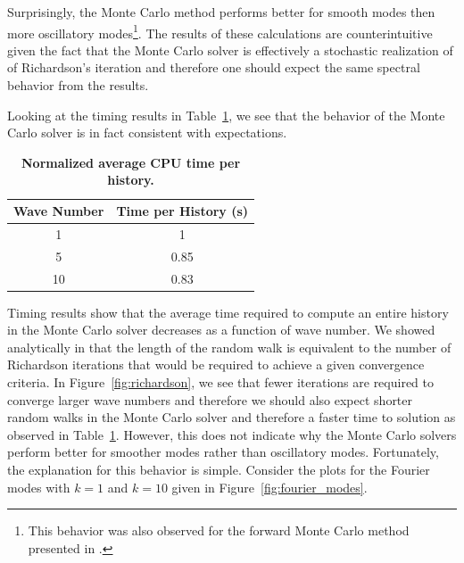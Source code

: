 \documentclass[note]{TechNote}
\begin{document}
Surprisingly, the Monte Carlo method performs better for smooth modes
then more oscillatory modes\footnote{This behavior was also observed
  for the forward Monte Carlo method presented in
  \cite{evans_monte_2012}.}. The results of these calculations are
counterintuitive given the fact that the Monte Carlo solver is
effectively a stochastic realization of of Richardson's iteration and
therefore one should expect the same spectral behavior from the
results.

Looking at the timing results in Table~\ref{tab:mc_timing}, we see
that the behavior of the Monte Carlo solver is in fact consistent with
expectations.
\begin{table}[h!]
  \begin{center}
    \begin{tabular}{cc}\hline\hline
      \multicolumn{1}{c}{\textbf{Wave Number}} & 
      \multicolumn{1}{c}{\textbf{Time per History (s)}} \\
      \hline
      1 & 1 \\
      5 & 0.85 \\
      10 & 0.83 \\
      \hline\hline
    \end{tabular}
  \end{center}
  \caption{\textbf{Normalized average CPU time per history.}}
  \label{tab:mc_timing}
\end{table}
Timing results show that the average time required to compute an
entire history in the Monte Carlo solver decreases as a function of
wave number. We showed analytically in \cite{slattery_2013} that the
length of the random walk is equivalent to the number of Richardson
iterations that would be required to achieve a given convergence
criteria. In Figure~\ref{fig:richardson}, we see that fewer iterations
are required to converge larger wave numbers and therefore we should
also expect shorter random walks in the Monte Carlo solver and
therefore a faster time to solution as observed in
Table~\ref{tab:mc_timing}. However, this does not indicate why the
Monte Carlo solvers perform better for smoother modes rather than
oscillatory modes. Fortunately, the explanation for this behavior is
simple. Consider the plots for the Fourier modes with $k = 1$ and $k =
10$ given in Figure~\ref{fig:fourier_modes}.
\end{document}
